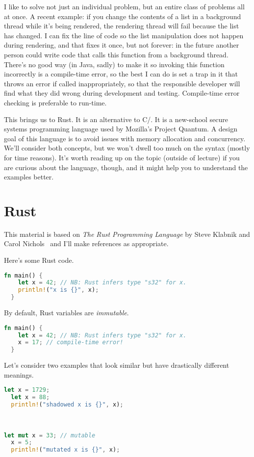 I like to solve not just an individual problem, but an entire class of problems all at once. A recent example: if you change the contents of a list in a background thread while it's being rendered, the rendering thread will fail because the list has changed. I can fix the line of code so the list manipulation does not happen during rendering, and that fixes it once, but not forever: in the future another person could write code that calls this function from a background thread. There's no good way (in Java, sadly) to make it so invoking this function incorrectly is a compile-time error, so the best I can do is set a trap in it that throws an error if called inappropriately, so that the responsible developer will find what they did wrong during development and testing. Compile-time error checking is preferable to run-time.

This brings us to Rust. It is an alternative to C/\CPP. It is a new-school
secure systems programming language used by Mozilla's Project Quantum. A design goal of this language is to avoid issues with memory allocation and concurrency. We'll consider both concepts, but we won't dwell too much on the syntax (mostly for time reasons). It's worth reading up on the topic (outside of lecture) if you are curious about the language, though, and it might help you to understand the examples better.  

\section*{Rust} This material is based
on \emph{The Rust Programming Language} by Steve Klabnik and Carol
Nichols~\cite{klabnik18:_rust_progr_languag} and I'll make references as appropriate.

Here's some Rust code.
\vspace*{-.5em}
\begin{lstlisting}[language=Rust]
  fn main() {
    let x = 42; // NB: Rust infers type "s32" for x.
    println!("x is {}", x);
  }
\end{lstlisting}
By default, Rust variables are \emph{immutable}.
\vspace*{-.5em}
\begin{lstlisting}[language=Rust]
  fn main() {
    let x = 42; // NB: Rust infers type "s32" for x.
    x = 17; // compile-time error!
  }
\end{lstlisting}
Let's consider two examples that look similar but have drastically different meanings.

\vspace*{-1.5em}
\begin{minipage}{.4\textwidth}
\begin{lstlisting}[language=Rust]
  let x = 1729;
  let x = 88;
  println!("shadowed x is {}", x);
\end{lstlisting}
\end{minipage}\
\begin{minipage}{.4\textwidth}
\begin{lstlisting}[language=Rust]
  let mut x = 33; // mutable
  x = 5;
  println!("mutated x is {}", x);
\end{lstlisting}
\end{minipage}

